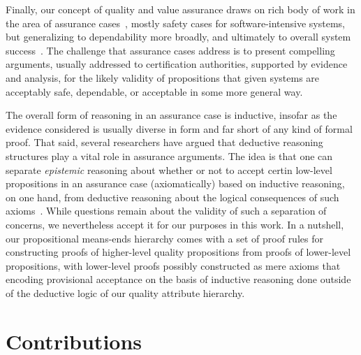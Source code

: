 \documentclass[conference]{IEEEtran}
\begin{document}
Finally, our concept of quality and value assurance draws on rich body of work in the area of assurance cases~\cite{}, mostly safety cases for software-intensive systems, but generalizing to dependability more broadly\cite{}, and ultimately to overall system success~\cite{knight-success-cases}. The challenge that assurance cases address is to present compelling arguments, usually addressed to certification authorities, supported by evidence and analysis, for the likely validity of propositions that given systems are acceptably safe, dependable, or acceptable in some more general way. 

The overall form of reasoning in an assurance case is inductive, insofar as the evidence considered is usually diverse in form and far short of any kind of formal proof. That said, several researchers have argued that deductive reasoning structures play a vital role in assurance arguments. The idea is that one can separate {\em epistemic} reasoning about whether or not to accept certin low-level propositions in an assurance case (axiomatically) based on inductive reasoning, on one hand, from deductive reasoning about the logical consequences of such axioms~\cite{rushby15}. While questions remain about the validity of such a separation of concerns, we nevertheless accept it for our purposes in this work. In a nutshell, our propositional means-ends hierarchy comes with a set of proof rules for constructing proofs of higher-level quality propositions from proofs of lower-level propositions, with lower-level proofs possibly constructed as mere axioms that encoding provisional acceptance on the basis of inductive reasoning done outside of the deductive logic of our quality attribute hierarchy.  

\section{Contributions}
\end{document}
